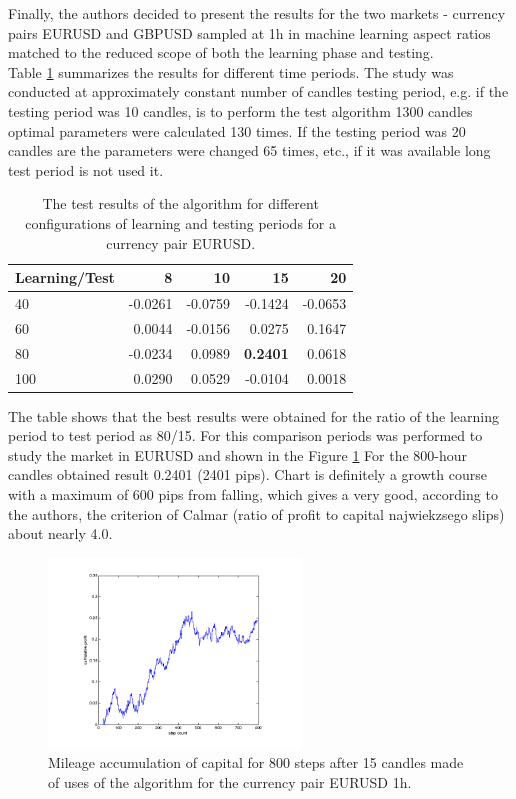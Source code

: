 \documentclass[runningheads,a4paper]{llncs}
\begin{document}
Finally, the authors decided to present the results for the two markets - currency pairs EURUSD and GBPUSD sampled at 1h in machine learning aspect ratios matched to the reduced scope of both the learning phase and testing.\\

Table \ref{tab:tab1} summarizes the results for different time periods. The study was conducted at approximately constant number of candles testing period, e.g. if the testing period was 10 candles, is to perform the test algorithm 1300 candles optimal parameters were calculated 130 times. If the testing period was 20 candles are the parameters were changed 65 times, etc., if it was available long test period is not used it.

\begin{table}[h!]
\centering
\caption{The test results of the algorithm for different configurations of learning and testing periods for a currency pair EURUSD.}
\label{tab:tab1}
\begin{tabular}{|l|r|r|r|r|} \hline
Learning/Test &	8	 &	10 &		15	 &	20 \\ \hline
40 &		-0.0261 &		-0.0759	 &	-0.1424	 &	-0.0653 \\ \hline
60 &		0.0044 &		-0.0156 &		0.0275 &		0.1647 \\ \hline
80 &		-0.0234 &		0.0989 &		\textbf{0.2401} &		0.0618 \\ \hline
100	 &	0.0290 &		0.0529 &		-0.0104	 &	0.0018 \\ \hline
\end{tabular}
\end{table}
\FloatBarrier

The table shows that the best results were obtained for the ratio of the learning period to test period as 80/15. For this comparison periods was performed to study the market in EURUSD and shown in the Figure \ref{fig:fig8} For the 800-hour candles obtained result 0.2401 (2401 pips). Chart is definitely a growth course with a maximum of 600 pips from falling, which gives a very good, according to the authors, the criterion of Calmar (ratio of profit to capital najwiekzsego slips) about nearly 4.0.\\

\begin{figure}[h!]
\centering
\includegraphics[width = 0.6\textwidth]{figures/rys8.png}
\caption{Mileage accumulation of capital for 800 steps after 15 candles made of uses of the algorithm for the currency pair EURUSD 1h.}
\label{fig:fig8}
\end{figure}
\FloatBarrier
\end{document}

